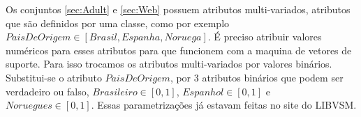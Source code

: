 Os conjuntos \ref{sec:Adult} e \ref{sec:Web} possuem atributos multi-variados, atributos que são definidos por uma classe, como por exemplo $PaisDeOrigem \in \left [ Brasil,Espanha,Noruega \right ]$. É preciso atribuir valores numéricos para esses atributos para que funcionem com a maquina de vetores de suporte. Para isso trocamos os atributos multi-variados por valores binários. Substitui-se o atributo $PaisDeOrigem$, por 3 atributos binários que podem ser verdadeiro ou falso, $Brasileiro \in \left [ 0,1 \right ]$, $Espanhol \in \left [ 0,1 \right ]$ e $Noruegues \in \left [ 0,1 \right ]$. Essas parametrizações já estavam feitas no site do LIBVSM.


